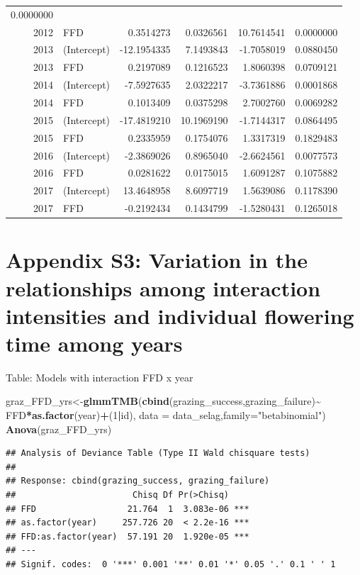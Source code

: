 \documentclass[
]{article}
\newenvironment{Shaded}{\begin{snugshade}}{\end{snugshade}}
\newcommand{\DataTypeTok}[1]{\textcolor[rgb]{0.13,0.29,0.53}{#1}}
\newcommand{\DecValTok}[1]{\textcolor[rgb]{0.00,0.00,0.81}{#1}}
\newcommand{\KeywordTok}[1]{\textcolor[rgb]{0.13,0.29,0.53}{\textbf{#1}}}
\newcommand{\NormalTok}[1]{#1}
\newcommand{\OperatorTok}[1]{\textcolor[rgb]{0.81,0.36,0.00}{\textbf{#1}}}
\newcommand{\StringTok}[1]{\textcolor[rgb]{0.31,0.60,0.02}{#1}}
\begin{document}
\begin{longtable}[]{@{}rlrrrr@{}}
0.0000000\tabularnewline
2012 & FFD & 0.3514273 & 0.0326561 & 10.7614541 &
0.0000000\tabularnewline
2013 & (Intercept) & -12.1954335 & 7.1493843 & -1.7058019 &
0.0880450\tabularnewline
2013 & FFD & 0.2197089 & 0.1216523 & 1.8060398 &
0.0709121\tabularnewline
2014 & (Intercept) & -7.5927635 & 2.0322217 & -3.7361886 &
0.0001868\tabularnewline
2014 & FFD & 0.1013409 & 0.0375298 & 2.7002760 &
0.0069282\tabularnewline
2015 & (Intercept) & -17.4819210 & 10.1969190 & -1.7144317 &
0.0864495\tabularnewline
2015 & FFD & 0.2335959 & 0.1754076 & 1.3317319 &
0.1829483\tabularnewline
2016 & (Intercept) & -2.3869026 & 0.8965040 & -2.6624561 &
0.0077573\tabularnewline
2016 & FFD & 0.0281622 & 0.0175015 & 1.6091287 &
0.1075882\tabularnewline
2017 & (Intercept) & 13.4648958 & 8.6097719 & 1.5639086 &
0.1178390\tabularnewline
2017 & FFD & -0.2192434 & 0.1434799 & -1.5280431 &
0.1265018\tabularnewline
\bottomrule
\end{longtable}

\hypertarget{appendix-s3-variation-in-the-relationships-among-interaction-intensities-and-individual-flowering-time-among-years}{%
\section{Appendix S3: Variation in the relationships among interaction
intensities and individual flowering time among
years}\label{appendix-s3-variation-in-the-relationships-among-interaction-intensities-and-individual-flowering-time-among-years}}

Table: Models with interaction FFD x year

\begin{Shaded}
\begin{Highlighting}[]
\NormalTok{graz\_FFD\_yrs\textless{}{-}}\KeywordTok{glmmTMB}\NormalTok{(}\KeywordTok{cbind}\NormalTok{(grazing\_success,grazing\_failure)}\OperatorTok{\textasciitilde{}}
\StringTok{                        }\NormalTok{FFD}\OperatorTok{*}\KeywordTok{as.factor}\NormalTok{(year)}\OperatorTok{+}\NormalTok{(}\DecValTok{1}\OperatorTok{|}\NormalTok{id),}
                      \DataTypeTok{data =}\NormalTok{ data\_selag,}\DataTypeTok{family=}\StringTok{"betabinomial"}\NormalTok{)}
\KeywordTok{Anova}\NormalTok{(graz\_FFD\_yrs)}
\end{Highlighting}
\end{Shaded}

\begin{verbatim}
## Analysis of Deviance Table (Type II Wald chisquare tests)
## 
## Response: cbind(grazing_success, grazing_failure)
##                       Chisq Df Pr(>Chisq)    
## FFD                  21.764  1  3.083e-06 ***
## as.factor(year)     257.726 20  < 2.2e-16 ***
## FFD:as.factor(year)  57.191 20  1.920e-05 ***
## ---
## Signif. codes:  0 '***' 0.001 '**' 0.01 '*' 0.05 '.' 0.1 ' ' 1
\end{verbatim}
\end{document}
